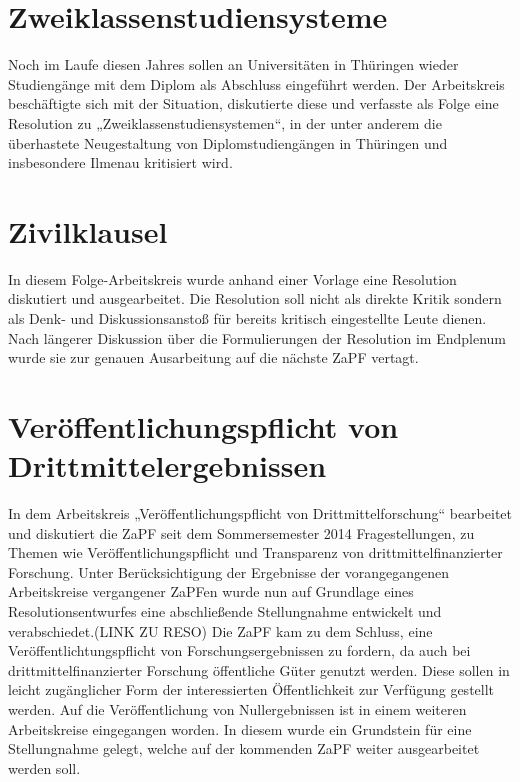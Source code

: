 \section*{Zweiklassenstudiensysteme}
Noch im Laufe diesen Jahres sollen an Universitäten in Thüringen wieder Studiengänge mit dem Diplom als Abschluss eingeführt werden. Der Arbeitskreis beschäftigte sich mit der Situation,
diskutierte diese und verfasste als Folge eine Resolution zu „Zweiklassenstudiensystemen“, in der unter anderem die überhastete Neugestaltung von Diplomstudiengängen in Thüringen und insbesondere Ilmenau kritisiert wird.

\section*{Zivilklausel}
In diesem Folge-Arbeitskreis wurde anhand einer Vorlage eine Resolution diskutiert und
ausgearbeitet. Die Resolution soll nicht als direkte Kritik sondern als Denk- und Diskussionsanstoß für bereits kritisch eingestellte Leute dienen. Nach längerer Diskussion über die Formulierungen der Resolution im Endplenum wurde sie zur genauen Ausarbeitung auf die nächste ZaPF vertagt.

\section*{Veröffentlichungspflicht von Drittmittelergebnissen}
In dem Arbeitskreis „Veröffentlichungspflicht von Drittmittelforschung“ bearbeitet und diskutiert die ZaPF seit dem Sommersemester 2014 Fragestellungen, zu Themen wie Veröffentlichungspflicht und Transparenz von drittmittelfinanzierter Forschung. Unter Berücksichtigung der Ergebnisse der vorangegangenen Arbeitskreise vergangener ZaPFen wurde nun auf Grundlage eines Resolutionsentwurfes eine abschließende Stellungnahme entwickelt und verabschiedet.(LINK ZU RESO)
Die ZaPF kam zu dem Schluss, eine Veröffentlichtungspflicht von Forschungsergebnissen zu fordern, da auch bei drittmittelfinanzierter Forschung öffentliche Güter genutzt werden. Diese sollen in leicht zugänglicher Form der interessierten Öffentlichkeit zur Verfügung gestellt werden.
Auf die Veröffentlichung von Nullergebnissen ist in einem weiteren Arbeitskreise eingegangen worden. In diesem wurde ein Grundstein für eine Stellungnahme gelegt, welche auf der kommenden ZaPF weiter ausgearbeitet werden soll.



